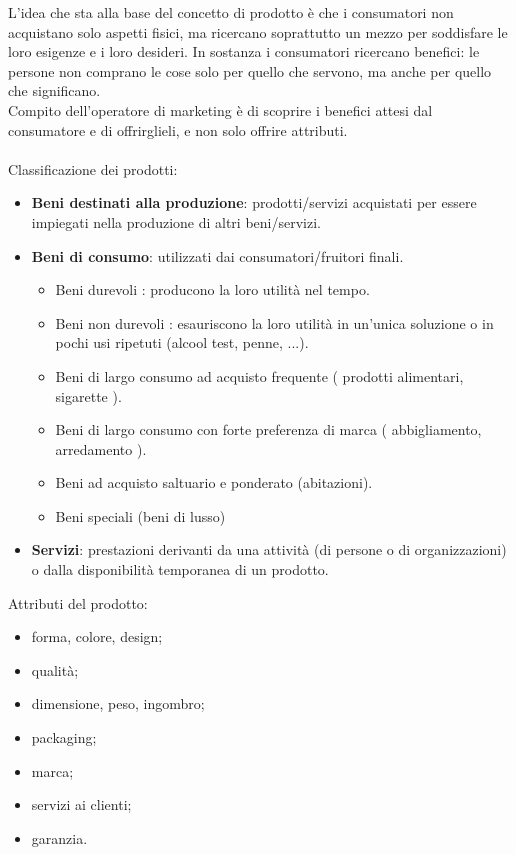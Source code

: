 L’idea che sta alla base del concetto di prodotto è che i consumatori non acquistano solo aspetti fisici, ma ricercano soprattutto un mezzo per soddisfare le loro esigenze e i loro desideri. In sostanza i consumatori ricercano benefici: le persone non comprano le cose solo per quello che servono, ma anche per quello che significano.
\\
Compito dell’operatore di marketing è di scoprire i benefici attesi dal consumatore e di offrirglieli, e non solo offrire attributi.
\\
\\
Classificazione dei prodotti:
\begin{itemize}
	\item \textbf{Beni destinati alla produzione}: prodotti/servizi acquistati per essere impiegati nella produzione di altri beni/servizi.
	\item \textbf{Beni di consumo}: utilizzati dai consumatori/fruitori finali.
	\begin{itemize}
		\item Beni durevoli : producono la loro utilità nel tempo.
		\item Beni non durevoli : esauriscono la loro utilità in un’unica
		soluzione o in pochi usi ripetuti (alcool test, penne, ...).
		\item Beni di largo consumo ad acquisto frequente ( prodotti alimentari, sigarette ).
		\item Beni di largo consumo con forte preferenza di marca
		( abbigliamento, arredamento ).
		\item Beni ad acquisto saltuario e ponderato (abitazioni).
		\item Beni speciali (beni di lusso)
	\end{itemize}
    \item \textbf{Servizi}: prestazioni derivanti da una attività (di persone o di organizzazioni) o dalla disponibilità temporanea di un prodotto.
\end{itemize}

Attributi del prodotto:
\begin{itemize}
	\item forma, colore, design;
	\item qualità;
	\item dimensione, peso, ingombro;
	\item packaging;
	\item marca;
	\item servizi ai clienti;
	\item garanzia.
\end{itemize}

